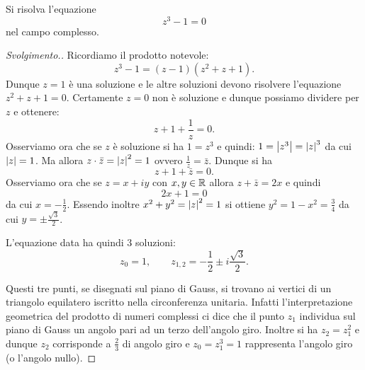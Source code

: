 \begin{exercise}
Si risolva l'equazione 
\[ 
 z^3 - 1 = 0
\]
nel campo complesso.
\end{exercise}
%
\begin{proof}[Svolgimento.]
Ricordiamo il prodotto notevole:
\[
  z^3 - 1 = (z-1)(z^2+z+1).
\]
Dunque $z=1$ è una soluzione e le altre soluzioni devono risolvere 
l'equazione $z^2+z+1=0$. 
Certamente $z=0$ non è soluzione e dunque possiamo dividere per $z$ 
e ottenere:
\[
  z + 1 + \frac 1 z = 0.
\]
Osserviamo ora che se $z$ è soluzione si ha $1=z^3$
e quindi: $1 = {\left|z^3\right|}= {\left|z\right|}^3$ da cui ${\left|z\right|} = 1$.
Ma allora $z\cdot \bar z = {\left|z\right|}^2 = 1$ ovvero $\frac 1 z = \bar z$.
Dunque si ha 
\[
    z + 1 + \bar z = 0.
\]
Osserviamo ora che se $z=x+iy$ con $x,y\in \mathbb R$ allora $z+\bar z = 2x$
e quindi 
\[
    2x + 1 = 0 
\]
da cui $x=-\frac 1 2$. Essendo inoltre $x^2+y^2={\left|z\right|}^2=1$ si ottiene
$y^2 = 1-x^2 = \frac 3 4$ da cui $y=\pm \frac{\sqrt 3}{2}$.

L'equazione data ha quindi $3$ soluzioni:
\[
z_0 = 1, \qquad 
z_{1,2} = -\frac 1 2 \pm i \frac{\sqrt 3} 2.
\]

Questi tre punti, se disegnati sul piano di Gauss, si trovano 
ai vertici di un triangolo equilatero iscritto nella circonferenza unitaria.
Infatti l'interpretazione geometrica del prodotto di numeri complessi ci dice 
che il punto $z_1$ individua sul piano di Gauss un angolo pari 
ad un terzo dell'angolo giro. Inoltre si ha $z_2 = z_1^2$ e dunque 
$z_2$ corrisponde a $\frac 2 3$ di angolo giro e $z_0=z_1^3 = 1$ rappresenta 
l'angolo giro (o l'angolo nullo).
\end{proof}